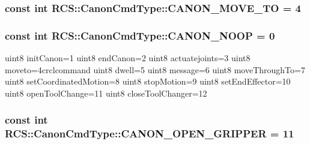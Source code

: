 \hypertarget{structRCS_1_1CanonCmdType_ad35a88bedd0d90392bb292084b6d8d7b}{
\subsubsection[{C\-A\-N\-O\-N\-\_\-\-M\-O\-V\-E\-\_\-\-T\-O}]{\setlength{\rightskip}{0pt plus 5cm}const int R\-C\-S\-::\-Canon\-Cmd\-Type\-::\-C\-A\-N\-O\-N\-\_\-\-M\-O\-V\-E\-\_\-\-T\-O = 4\hspace{0.3cm}{\ttfamily [static]}}}\label{structRCS_1_1CanonCmdType_ad35a88bedd0d90392bb292084b6d8d7b}
\hypertarget{structRCS_1_1CanonCmdType_a05e58302709ff5018a0796bf985abde9}{
\subsubsection[{C\-A\-N\-O\-N\-\_\-\-N\-O\-O\-P}]{\setlength{\rightskip}{0pt plus 5cm}const int R\-C\-S\-::\-Canon\-Cmd\-Type\-::\-C\-A\-N\-O\-N\-\_\-\-N\-O\-O\-P = 0\hspace{0.3cm}{\ttfamily [static]}}}\label{structRCS_1_1CanonCmdType_a05e58302709ff5018a0796bf985abde9}
uint8 init\-Canon=1 uint8 end\-Canon=2 uint8 actuatejoints=3 uint8 moveto=4crclcommand uint8 dwell=5 uint8 message=6 uint8 move\-Through\-To=7 uint8 set\-Coordinated\-Motion=8 uint8 stop\-Motion=9 uint8 set\-End\-Effector=10 uint8 open\-Tool\-Change=11 uint8 close\-Tool\-Changer=12 \hypertarget{structRCS_1_1CanonCmdType_a4f12897aa5adf1424c660c686b1e18e6}{
\subsubsection[{C\-A\-N\-O\-N\-\_\-\-O\-P\-E\-N\-\_\-\-G\-R\-I\-P\-P\-E\-R}]{\setlength{\rightskip}{0pt plus 5cm}const int R\-C\-S\-::\-Canon\-Cmd\-Type\-::\-C\-A\-N\-O\-N\-\_\-\-O\-P\-E\-N\-\_\-\-G\-R\-I\-P\-P\-E\-R = 11\hspace{0.3cm}{\ttfamily [static]}}}\label{structRCS_1_1CanonCmdType_a4f12897aa5adf1424c660c686b1e18e6}
